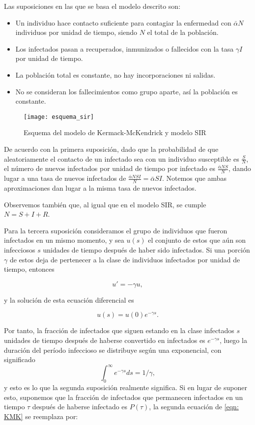 Las suposiciones en las que se basa el modelo descrito son:

\begin{itemize}
\item Un individuo hace contacto suficiente para contagiar la enfermedad con $\bar{\alpha} N$ individuos por unidad de tiempo, siendo $N$ el total de la población.
\item Los infectados pasan a recuperados, inmunizados o fallecidos con la tasa $\gamma I$ por unidad de tiempo.
\item La población total es constante, no hay incorporaciones ni salidas.
\item No se consideran los fallecimientos como grupo aparte, así la población es constante.
\end{itemize}

\begin{figure}
\begin{center}
\caption{Esquema del modelo de Kermack-McKendrick y modelo SIR}
\texttt{[image: esquema\_sir]}
\end{center}
\end{figure}

De acuerdo con la primera suposición, dado que la probabilidad de que aleatoriamente el contacto de un infectado sea con un individuo susceptible es $\frac{S}{N}$, el número de nuevos infectados por unidad de tiempo por infectado es $\frac{\bar{\alpha} NS}{N}$, dando lugar a una tasa de nuevos infectados de $\frac{\bar{\alpha}  N S I}{N}=\bar{\alpha} SI$. Notemos que ambas aproximaciones dan lugar a la misma tasa de nuevos infectados.

Observemos también que, al igual que en el modelo SIR, se cumple $N=S+I+R$.

Para la tercera suposición consideramos el grupo de individuos que fueron infectados en un mismo momento, y sea $u(s)$ el conjunto de estos que aún son infecciosos $s$ unidades de tiempo después de haber sido infectados. Si una porción $\gamma$ de estos deja de pertenecer a la clase de individuos infectados por unidad de tiempo, entonces

$$u'=-\gamma u,$$

y la solución de esta ecuación diferencial es

$$u(s)=u(0)e^{-\gamma s}.$$

Por tanto, la fracción de infectados que siguen estando en la clase infectados $s$ unidades de tiempo después de haberse convertido en infectados es $e^{-\gamma s}$, luego la duración del período infeccioso se distribuye según una exponencial, con significado
$$\int_0^\infty e^{-\gamma s}ds=1/\gamma,$$
y esto es lo que la segunda suposición realmente significa. Si en lugar de suponer esto, suponemos que la fracción de infectados que permanecen infectados en un tiempo $\tau$ después de haberse infectado es $P(\tau )$, la segunda ecuación de \eqref{eqn: KMK} se reemplaza por:

